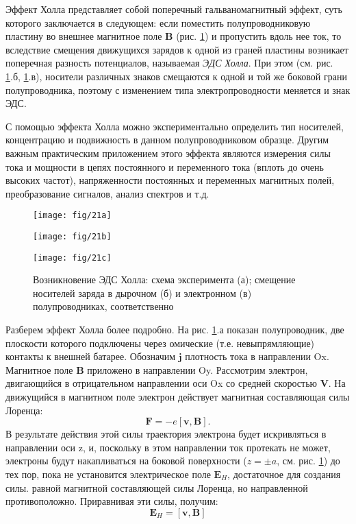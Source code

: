 \documentclass[a4paper,14pt]{extarticle}
\renewcommand{\vec}{\mathbf} %
\begin{document}
Эффект Холла представляет собой поперечный гальваномагнитный эффект, суть которого заключается в следующем: если поместить полупроводниковую пластину во внешнее магнитное поле $\vec{B}$ (рис. \ref{fig:8}) и пропустить вдоль нее ток, то вследствие смещения движущихся зарядов к одной из граней пластины возникает поперечная разность потенциалов, называемая \textit{ЭДС Холла}. При этом (см. рис. \ref{fig:8}.б, \ref{fig:8}.в), носители различных знаков смещаются к одной и той же боковой грани полупроводника, поэтому с изменением типа электропроводности меняется и знак ЭДС.

С помощью эффекта Холла можно экспериментально определить тип носителей, концентрацию и подвижность в данном полупроводниковом образце. Другим важным практическим приложением этого эффекта являются измерения силы тока и мощности в цепях постоянного и переменного тока  (вплоть до очень высоких частот), напряженности постоянных и переменных магнитных полей, преобразование сигналов, анализ спектров и т.д.

\begin{figure}[h!]
\begin{minipage}[h]{0.329\linewidth}
		\centering
	\texttt{[image: fig/21a]}
\end{minipage}
\begin{minipage}[h]{0.329\linewidth}
		\centering
	\texttt{[image: fig/21b]}
\end{minipage}
\begin{minipage}[h]{0.329\linewidth}
		\centering
	\texttt{[image: fig/21c]}
\end{minipage}
	\caption{Возникновение ЭДС Холла: схема эксперимента (а); смещение носителей заряда в дырочном (б) и электронном (в) полупроводниках, соответственно}
	\label{fig:8}
\end{figure}

Разберем эффект Холла более подробно. На рис. \ref{fig:8}.а показан полупроводник, две плоскости которого подключены через омические (т.е. невыпрямляющие) контакты к внешней батарее. Обозначим $\vec{j}$ плотность тока в направлении Ox. Магнитное поле $\vec{B}$ приложено в направлении Oy. Рассмотрим электрон, двигающийся в отрицательном направлении оси Ox со средней скоростью $\vec{V}$. На движущийся в магнитном поле электрон действует магнитная составляющая силы Лоренца:
$$\vec{F} = -e [\vec{v}, \vec{B}].$$
В результате действия этой силы траектория электрона будет искривляться  в направлении оси z, и, поскольку в этом направлении ток протекать не может, электроны будут накапливаться на боковой поверхности ($z=\pm a$, см. рис. \ref{fig:8}) до тех пор, пока не установится электрическое поле $\vec{E}_H$, достаточное для создания силы. равной магнитной составляющей силы Лоренца, но направленной противоположно. Приравнивая эти силы, получим: 
\begin{equation}
\label{eq:2.1}
	\vec{E}_H=[\vec{v}, \vec{B}]
\end{equation}
\end{document}
